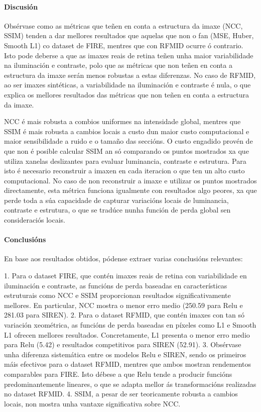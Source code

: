 \paragraph{Discusión}
\label{par:Discusión}

Obsérvase como as métricas que teñen en conta a estructura da imaxe (NCC, SSIM) tenden a dar mellores resultados que aquelas que non o fan (MSE, Huber, Smooth L1) co dataset de FIRE, mentres que con RFMID ocurre ó contrario.
Isto pode deberse a que as imaxes reais de retina teñen unha maior variabilidade na iluminación e contraste, polo que as métricas que non teñen en conta a estructura da imaxe serán menos robustas a estas diferenzas.
No caso de RFMID, ao ser imaxes sintéticas, a variabilidade na iluminación e contraste é nula, o que explica os mellores resultados das métricas que non teñen en conta a estructura da imaxe.

NCC é mais robusta a combios uniformes na intensidade global, mentres que SSIM é mais robusta a cambios locais a custo dun maior custo computacional e maior sensibilidade a ruido e o tamaño das seccións.
O custo engadido provén de que non é posible calcular SSIM an só comparando os puntos mostrados xa que utiliza xanelas deslizantes para evaluar luminancia, contraste e estrutura. 
Para isto é necesario reconstruir a imaxen en cada iteracion o que ten un alto custo computacional. No caso de non reconstruir a imaxe e utilizar os puntos mostrados directamente, esta métrica funciona igualmente con resultados algo peores, xa que perde toda a súa capacidade de capturar variacións locais de luminancia, contraste e estrutura, o que se tradúce nunha función de perda global sen consideraciós locais.

\paragraph{Conclusións}
\label{par:Conclusións}

En base aos resultados obtidos, pódense extraer varias conclusións relevantes:

1. Para o dataset FIRE, que contén imaxes reais de retina con variabilidade en iluminación e contraste, as funcións de perda baseadas en características estruturais como NCC e SSIM proporcionan resultados significativamente mellores. En particular, NCC mostra o menor erro medio (250.59 para Relu e 281.03 para SIREN).
2. Para o dataset RFMID, que contén imaxes con tan só variación xeométrica, as funcións de perda baseadas en píxeles como L1 e Smooth L1 ofrecen mellores resultados. Concretamente, L1 presenta o menor erro medio para Relu (5.42) e resultados competitivos para SIREN (52.91).
3. Obsérvase unha diferenza sistemática entre os modelos Relu e SIREN, sendo os primeiros máis efectivos para o dataset RFMID, mentres que ambos mostran rendementos comparables para FIRE. Isto débese a que Relu tende a producir funcións predominantemente lineares, o que se adapta mellor ás transformacións realizadas no dataset RFMID.
4. SSIM, a pesar de ser teoricamente robusta a cambios locais, non mostra unha vantaxe significativa sobre NCC.

